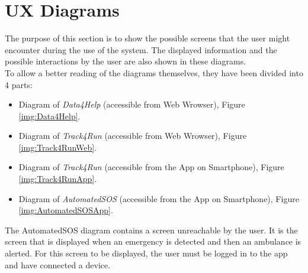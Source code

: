 \section{UX Diagrams}
The purpose of this section is to show the possible screens that the user might encounter during the use of the system.
The displayed information and the possible interactions by the user are also shown in these diagrams.\\
To allow a better reading of the diagrams themselves, they have been divided into 4 parts:
\begin{itemize}
  \item Diagram of \textit{Data4Help} (accessible from Web Wrowser), Figure \ref{img:Data4Help}.
  \item Diagram of \textit{Track4Run} (accessible from Web Wrowser), Figure \ref{img:Track4RunWeb}.
  \item Diagram of \textit{Track4Run} (accessible from the App on Smartphone), Figure \ref{img:Track4RunApp}.
  \item Diagram of \textit{AutomatedSOS} (accessible from the App on Smartphone), Figure \ref{img:AutomatedSOSApp}.
\end{itemize}
The AutomatedSOS diagram contains a screen unreachable by the user. It is the screen that is displayed when an emergency is detected and then an ambulance is alerted. For this screen to be displayed, the user must be logged in to the app and have connected a device.


